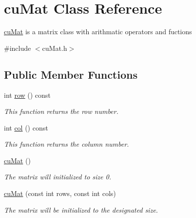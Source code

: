 \hypertarget{classcuMat}{}\section{cu\+Mat Class Reference}
\label{classcuMat}


\mbox{\hyperlink{classcuMat}{cu\+Mat}} is a matrix class with arithmatic operators and fuctions  




{\ttfamily \#include $<$cu\+Mat.\+h$>$}

\subsection*{Public Member Functions}
\begin{DoxyCompactItemize}
\item 
\mbox{\label{classcuMat_a7708eee2489a568abaeb9e7794130665}} 
int \mbox{\hyperlink{classcuMat_a7708eee2489a568abaeb9e7794130665}{row}} () const
\begin{DoxyCompactList}\small\item\em This function returns the row number. \end{DoxyCompactList}\item 
\mbox{\label{classcuMat_a0680edf687da83952a4492327a4e1b2f}} 
int \mbox{\hyperlink{classcuMat_a0680edf687da83952a4492327a4e1b2f}{col}} () const
\begin{DoxyCompactList}\small\item\em This function returns the column number. \end{DoxyCompactList}\item 
\mbox{\label{classcuMat_aedab273f58ba63771b24b3850ce74fd2}} 
\mbox{\hyperlink{classcuMat_aedab273f58ba63771b24b3850ce74fd2}{cu\+Mat}} ()
\begin{DoxyCompactList}\small\item\em The matrix will initialized to size 0. \end{DoxyCompactList}\item 
\mbox{\label{classcuMat_ab618e94a549bf70559e0a4fbc54dd17a}} 
\mbox{\hyperlink{classcuMat_ab618e94a549bf70559e0a4fbc54dd17a}{cu\+Mat}} (const int rows, const int cols)
\begin{DoxyCompactList}\small\item\em The matrix will be initialized to the designated size. \end{DoxyCompactList}\item 

\end{DoxyCompactItemize}
